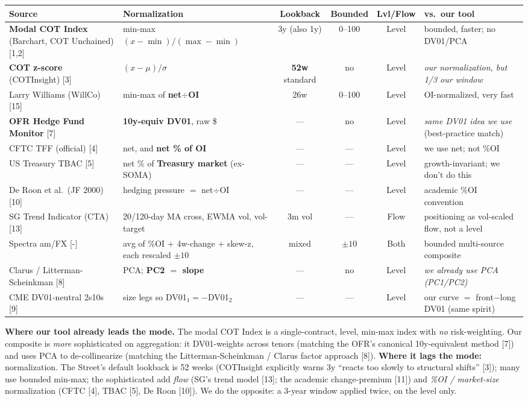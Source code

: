 \documentclass[10pt,a4paper]{article}
\newcommand{\rf}[1]{{\footnotesize[#1]}}
\begin{document}
\begin{center}\begin{tabular}{p{3.1cm}p{3.3cm}cccp{3.2cm}}
\toprule
Source & Normalization & Lookback & Bounded & Lvl/Flow & vs.\ our tool\\
\midrule
\textbf{Modal COT Index} (Barchart, COT Unchained) \rf{1,2} & min-max $(x-\min)/(\max-\min)$ & 3y (also 1y) & 0--100 & Level & bounded, faster; no DV01/PCA\\
\textbf{COT z-score} (COTInsight) \rf{3} & $(x-\mu)/\sigma$ & \textbf{52w} standard & no & Level & \emph{our normalization, but 1/3 our window}\\
Larry Williams (WillCo) \rf{15} & min-max of \textbf{net$\div$OI} & 26w & 0--100 & Level & OI-normalized, very fast\\
\textbf{OFR Hedge Fund Monitor} \rf{7} & \textbf{10y-equiv DV01}, raw \$ & --- & no & Level & \emph{same DV01 idea we use} (best-practice match)\\
CFTC TFF (official) \rf{4} & net, and \textbf{net \% of OI} & --- & --- & Level & we use net; not \%OI\\
US Treasury TBAC \rf{5} & net \% of \textbf{Treasury market} (ex-SOMA) & --- & --- & Level & growth-invariant; we don't do this\\
De Roon et al.\ (JF 2000) \rf{10} & hedging pressure $=$ net$\div$OI & --- & --- & Level & academic \%OI convention\\
SG Trend Indicator (CTA) \rf{13} & 20/120-day MA cross, EWMA vol, vol-target & 3m vol & --- & Flow & positioning as vol-scaled flow, not a level\\
Spectra am/FX \rf{-} & avg of \%OI $+$ 4w-change $+$ skew-z, each rescaled $\pm10$ & mixed & $\pm10$ & Both & bounded multi-source composite\\
Clarus / Litterman-Scheinkman \rf{8} & PCA; \textbf{PC2 $=$ slope} & --- & no & Level & \emph{we already use PCA (PC1/PC2)}\\
CME DV01-neutral 2s10s \rf{9} & size legs so DV01$_1=-$DV01$_2$ & --- & --- & Level & our curve $=$ front$-$long DV01 (same spirit)\\
\bottomrule
\end{tabular}\end{center}

\textbf{Where our tool already leads the mode.} The modal COT Index is a single-contract, level, min-max
index with \emph{no} risk-weighting. Our composite is \emph{more} sophisticated on aggregation: it
DV01-weights across tenors (matching the OFR's canonical 10y-equivalent method \rf{7}) and uses PCA to
de-collinearize (matching the Litterman-Scheinkman / Clarus factor approach \rf{8}). \textbf{Where it
lags the mode:} normalization. The Street's default lookback is 52 weeks (COTInsight explicitly warns 3y
``reacts too slowly to structural shifts'' \rf{3}); many use bounded min-max; the sophisticated add
\emph{flow} (SG's trend model \rf{13}; the academic change-premium \rf{11}) and \emph{\%OI / market-size}
normalization (CFTC \rf{4}, TBAC \rf{5}, De Roon \rf{10}). We do the opposite: a 3-year window applied
twice, on the level only.
\end{document}
